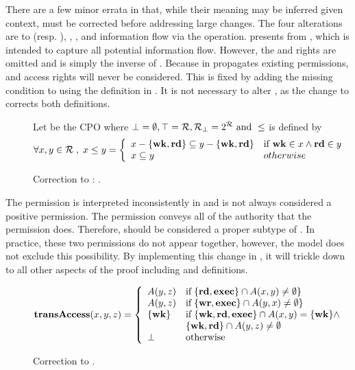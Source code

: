 There are a few minor errata in \TMSW{} that, while their meaning may be inferred given context, must be corrected before addressing large changes.
The four alterations are to \mutable{} (resp. \readable{}), \rightsset{}, \transaccess{}, and information flow via the \create{} operation.
 presents \mutable{} from \TMSW{}, which is intended to capture all potential information flow.
However, the \readright{} and \weakright{} rights are omitted and \readable{} is simply the inverse of \mutable{}.
Because \transaccess{} in \potacc{} propagates existing permissions, \readright{} and \weakright{} access rights will never be considered.
This is fixed by adding the missing condition to \mutable{} using the definition in .
It is not necessary to alter \readable{}, as the change to \mutable{} corrects both definitions.

\begin{figure}
Let \rightscpo{} be the CPO where \( \bot = \emptyset, \top = \mathcal{R}, \mathcal{R}_{\bot} = 2^{\mathcal{R}} \text{ and } \leq\) is defined by 
\[
\forall x,y \in \mathcal{R} \;,\; 
x \leq{} y =
\left\{
\begin{array}{ll}
x - \{\mathbf{wk},\mathbf{rd}\} \subseteq y - \{\mathbf{wk},\mathbf{rd}\} & \text{if } \mathbf{wk} \in x \land \mathbf{rd} \in y\\
x \subseteq y & otherwise
\end{array}
\right.
\]
\caption{Correction to \modellbl{} : \rightscpo.\label{def:SW:errata:rights-cpo}}
\end{figure}

The \weakright{} permission is interpreted inconsistently in \TMSW{} and is not always considered a positive permission.
The \readright{} permission conveys all of the authority that the \weakright{} permission does.
Therefore, \readright{} should be considered a proper subtype of \weakright{}.
In practice, these two permissions do not appear together, however, the model does not exclude this possibility.
By implementing this change in \rightscpo{}, it will trickle down to all other aspects of the proof including \lub{} and \potacc{} definitions.


\begin{figure}
\[ 
\mathbf{transAccess}(x,y,z) = 
\left\{
\begin{array}{ll}
  A(y,z) & \textnormal{if} \; \{\mathbf{rd}, \mathbf{exec}\} \cap A(x,y) \neq \emptyset \} \\
  A(y,z) & \textnormal{if} \; \{\mathbf{wr}, \mathbf{exec}\} \cap A(y,x) \neq \emptyset \} \\
  \{\mathbf{wk}\} & \textnormal{if} \; \{\mathbf{wk}, \mathbf{rd}, \mathbf{exec}\} \cap A(x,y) = \{\mathbf{wk}\} \land \\
  & \{\mathbf{wk},\mathbf{rd}\} \cap A(y,z) \neq \emptyset \\
  \bot & \textnormal{otherwise} \\
\end{array}
\right.
\]
\caption{Correction to \transaccess.\label{def:SW:errata:transaccess}}
\end{figure}


